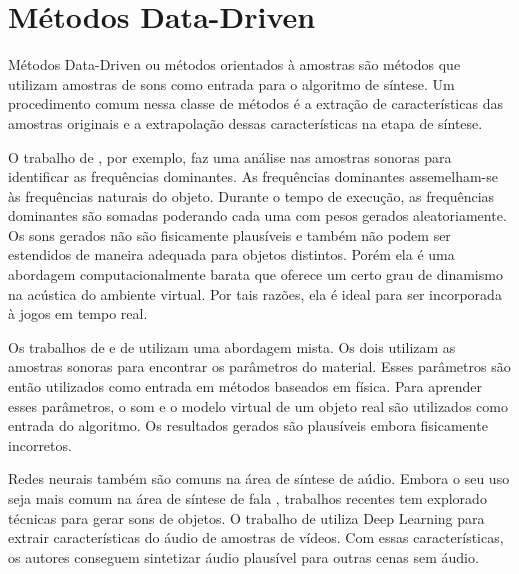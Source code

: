 \section{Métodos Data-Driven}
Métodos Data-Driven ou métodos orientados à amostras são métodos que utilizam amostras de sons como entrada para o algoritmo de síntese. Um procedimento comum nessa classe de métodos é a extração de características das amostras originais e a extrapolação dessas características na etapa de síntese.

O trabalho de \cite{lloyd2011sound}, por exemplo, faz uma análise nas amostras sonoras para identificar as frequências dominantes. As frequências dominantes assemelham-se às frequências naturais do objeto. Durante o tempo de execução, as frequências dominantes são somadas poderando cada uma com pesos gerados aleatoriamente. Os sons gerados não são fisicamente plausíveis e também não podem ser estendidos de maneira adequada para objetos distintos. Porém ela é uma abordagem computacionalmente barata que oferece um certo grau de dinamismo na acústica do ambiente virtual. Por tais razões, ela é ideal para ser incorporada à jogos em tempo real.

Os trabalhos de \cite{ren2013example} e de \cite{sterling2016interactive} utilizam uma abordagem mista. Os dois utilizam as amostras sonoras para encontrar os parâmetros do material. Esses parâmetros são então utilizados como entrada em métodos baseados em física. Para aprender esses parâmetros, o som e o modelo virtual de um objeto real são utilizados como entrada do algoritmo. Os resultados gerados são plausíveis embora fisicamente incorretos. 

Redes neurais também são comuns na área de síntese de aúdio. Embora o seu uso seja mais comum na área de síntese de fala \cite{rahim1993use, ling2015deep}, trabalhos recentes tem explorado técnicas para gerar sons de objetos. O trabalho de \cite{visualIndicatedSounds} utiliza Deep Learning para extrair características do áudio de amostras de vídeos. Com essas características, os autores conseguem sintetizar áudio plausível para outras cenas sem áudio.

